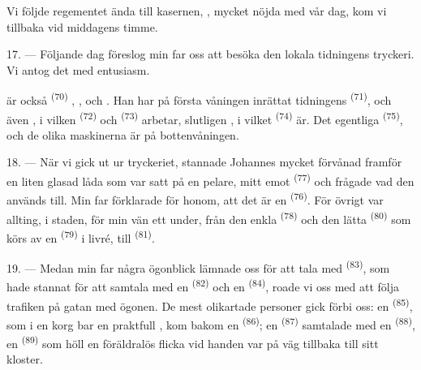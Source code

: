 Vi följde regementet ända till kasernen, , mycket nöjda med vår dag, kom vi
tillbaka vid middagens timme.

\VUsaut{3.0mm}

17. --- Följande dag föreslog min far oss att besöka den lokala tidningens tryckeri. Vi antog
det med entusiasm.

 är också  \textsuperscript{(70)}
, ,  och
. Han har på första våningen inrättat tidningens
 \textsuperscript{(71)}, och även , i
vilken  \textsuperscript{(72)} och
 \textsuperscript{(73)} arbetar, slutligen
, i vilket  \textsuperscript{(74)}
är. Det egentliga  \textsuperscript{(75)},
 och de olika maskinerna är på bottenvåningen.

\VUsaut{3.0mm}

18. --- När vi gick ut ur tryckeriet, stannade Johannes mycket förvånad framför en liten
glasad låda som var satt på en pelare, mitt emot
 \textsuperscript{(77)} och frågade vad den används
till. Min far förklarade för honom, att det är en 
\textsuperscript{(76)}. För övrigt var allting, i staden, för min vän ett under, från den
enkla  \textsuperscript{(78)} och den lätta 
\textsuperscript{(80)} som körs av en
 \textsuperscript{(79)} i livré, till 
\textsuperscript{(81)}.

19. --- Medan min far några ögonblick lämnade oss för att tala med
 \textsuperscript{(83)}, som hade stannat för att
samtala med en  \textsuperscript{(82)} och en
 \textsuperscript{(84)}, roade vi oss med att följa trafiken på
gatan med ögonen. De mest olikartade personer gick förbi oss: en
 \textsuperscript{(85)}, som i en korg bar en praktfull
, kom bakom en  \textsuperscript{(86)}; en
 \textsuperscript{(87)} samtalade med en
 \textsuperscript{(88)}, en 
\textsuperscript{(89)} som höll en föräldralös flicka vid handen var på väg tillbaka till sitt
kloster.

